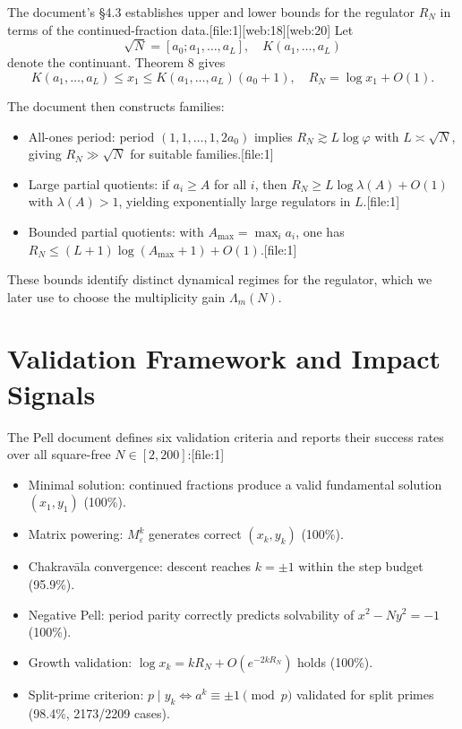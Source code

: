 \documentclass[11pt]{article}
\begin{document}
The document's §4.3 establishes upper and lower bounds for the regulator
\(R_N\) in terms of the continued-fraction data.[file:1][web:18][web:20] Let
\[
\sqrt{N} = [a_0; a_1,\dots,a_L], \quad
K(a_1,\dots,a_L)
\]
denote the continuant. Theorem 8 gives
\[
K(a_1,\dots,a_L) \le x_1 \le K(a_1,\dots,a_L)(a_0+1), \quad
R_N = \log x_1 + O(1).
\]

The document then constructs families:

\begin{itemize}
  \item All-ones period: period \((1,1,\dots,1,2a_0)\) implies
        \(R_N \gtrsim L \log \varphi\) with \(L\asymp\sqrt{N}\), giving
        \(R_N \gg \sqrt{N}\) for suitable families.[file:1]
  \item Large partial quotients: if \(a_i \ge A\) for all \(i\), then
        \(R_N \ge L \log \lambda(A) + O(1)\) with \(\lambda(A) > 1\),
        yielding exponentially large regulators in \(L\).[file:1]
  \item Bounded partial quotients: with
        \(A_{\max} = \max_i a_i\), one has
        \(R_N \le (L+1)\log(A_{\max}+1) + O(1)\).[file:1]
\end{itemize}

These bounds identify distinct dynamical regimes for the regulator,
which we later use to choose the multiplicity gain \(\Lambda_m(N)\).

\section{Validation Framework and Impact Signals}

The Pell document defines six validation criteria and reports their
success rates over all square-free \(N\in[2,200]\):[file:1]

\begin{itemize}
  \item Minimal solution: continued fractions produce a valid fundamental
        solution \((x_1,y_1)\) (100\%).
  \item Matrix powering: \(M_\varepsilon^k\) generates correct
        \((x_k,y_k)\) (100\%).
  \item Chakrav\=ala convergence: descent reaches \(k=\pm 1\) within the
        step budget (95.9\%).
  \item Negative Pell: period parity correctly predicts solvability of
        \(x^2 - Ny^2 = -1\) (100\%).
  \item Growth validation: \(\log x_k = k R_N + O(e^{-2kR_N})\) holds
        (100\%).
  \item Split-prime criterion: \(p\mid y_k \iff a^k \equiv \pm 1 \pmod p\)
        validated for split primes (98.4\%, 2173/2209 cases).
\end{itemize}
\end{document}
